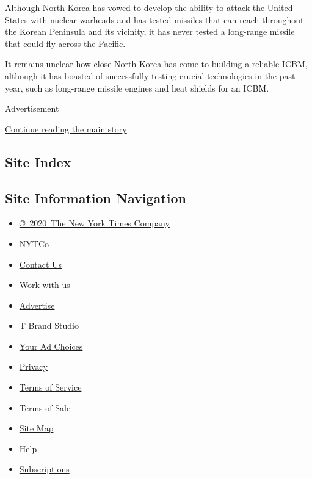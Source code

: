 Although North Korea has vowed to develop the ability to attack the
United States with nuclear warheads and has tested missiles that can
reach throughout the Korean Peninsula and its vicinity, it has never
tested a long-range missile that could fly across the Pacific.

It remains unclear how close North Korea has come to building a reliable
ICBM, although it has boasted of successfully testing crucial
technologies in the past year, such as long-range missile engines and
heat shields for an ICBM.

Advertisement

\protect\hyperlink{after-bottom}{Continue reading the main story}

\hypertarget{site-index}{%
\subsection{Site Index}\label{site-index}}

\hypertarget{site-information-navigation}{%
\subsection{Site Information
Navigation}\label{site-information-navigation}}

\begin{itemize}
\tightlist
\item
  \href{https://help.nytimes3xbfgragh.onion/hc/en-us/articles/115014792127-Copyright-notice}{©~2020~The
  New York Times Company}
\end{itemize}

\begin{itemize}
\tightlist
\item
  \href{https://www.nytco.com/}{NYTCo}
\item
  \href{https://help.nytimes3xbfgragh.onion/hc/en-us/articles/115015385887-Contact-Us}{Contact
  Us}
\item
  \href{https://www.nytco.com/careers/}{Work with us}
\item
  \href{https://nytmediakit.com/}{Advertise}
\item
  \href{http://www.tbrandstudio.com/}{T Brand Studio}
\item
  \href{https://www.nytimes3xbfgragh.onion/privacy/cookie-policy\#how-do-i-manage-trackers}{Your
  Ad Choices}
\item
  \href{https://www.nytimes3xbfgragh.onion/privacy}{Privacy}
\item
  \href{https://help.nytimes3xbfgragh.onion/hc/en-us/articles/115014893428-Terms-of-service}{Terms
  of Service}
\item
  \href{https://help.nytimes3xbfgragh.onion/hc/en-us/articles/115014893968-Terms-of-sale}{Terms
  of Sale}
\item
  \href{https://spiderbites.nytimes3xbfgragh.onion}{Site Map}
\item
  \href{https://help.nytimes3xbfgragh.onion/hc/en-us}{Help}
\item
  \href{https://www.nytimes3xbfgragh.onion/subscription?campaignId=37WXW}{Subscriptions}
\end{itemize}
